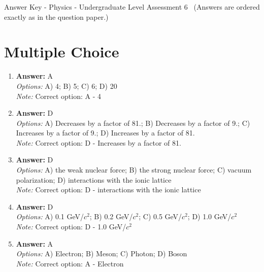 \documentclass[12pt]{article}
\begin{document}
\begin{center}
Answer Key - Physics - Undergraduate Level Assessment 6 \
\small (Answers are ordered exactly as in the question paper.)
\end{center}

\section*{Multiple Choice}
\begin{enumerate}[label=\arabic*.]
\item \textbf{Answer:} A
\\ \textit{Options:} A) 4; B) 5; C) 6; D) 20
\\ \textit{Note:} Correct option: A - 4
\item \textbf{Answer:} D
\\ \textit{Options:} A) Decreases by a factor of 81.; B) Decreases by a factor of 9.; C) Increases by a factor of 9.; D) Increases by a factor of 81.
\\ \textit{Note:} Correct option: D - Increases by a factor of 81.
\item \textbf{Answer:} D
\\ \textit{Options:} A) the weak nuclear force; B) the strong nuclear force; C) vacuum polarization; D) interactions with the ionic lattice
\\ \textit{Note:} Correct option: D - interactions with the ionic lattice
\item \textbf{Answer:} D
\\ \textit{Options:} A) 0.1 GeV/$c^2$; B) 0.2 GeV/$c^2$; C) 0.5 GeV/$c^2$; D) 1.0 GeV/$c^2$
\\ \textit{Note:} Correct option: D - 1.0 GeV/$c^2$
\item \textbf{Answer:} A
\\ \textit{Options:} A) Electron; B) Meson; C) Photon; D) Boson
\\ \textit{Note:} Correct option: A - Electron
\end{enumerate}
\end{document}
